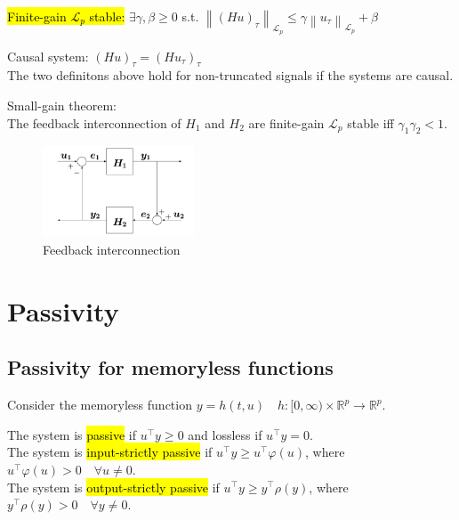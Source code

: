 \begin{definition}
    \hl{Finite-gain $\mathscr{L}_{p}$ stable:}
    $\exists\gamma, \beta \geq 0$ s.t. $\left\|(H u)_{\tau}\right\|_{\mathscr{L}_{p}} \leq \gamma\left\|u_{\tau}\right\|_{\mathscr{L}_{p}}+\beta$
\end{definition}
\begin{definition}
    Causal system: $(H u)_{\tau}=\left(H u_{\tau}\right)_{\tau}$\\
    The two definitons above hold for non-truncated signals if the systems are causal.
\end{definition}

\begin{theorem}
    Small-gain theorem:\\
    The feedback interconnection of $H_1$ and $H_2$ are finite-gain $\mathscr{L}_{p}$ stable
    iff $\gamma_1 \gamma_2 < 1$.
\end{theorem}
\begin{figure}[!htb]
        \includegraphics[width = 0.4\textwidth]{figures/fb.png}
        \caption{Feedback interconnection}
\end{figure}

\section{Passivity}
\subsection{Passivity for memoryless functions}
Consider the memoryless function $y=h(t, u) \quad h:[0, \infty) \times \mathbb{R}^{p} \rightarrow \mathbb{R}^{p}$.
\begin{definition}
    The system is \hl{passive} if $u^{\top} y \geq 0$ and lossless if $u^{\top} y=0$.\\
    The system is \hl{input-strictly passive} if $u^{\top} y \geq u^{\top} \varphi(u)$, where $u^{\top} \varphi(u)>0 \quad \forall u \neq 0$.\\
    The system is \hl{output-strictly passive} if $u^{\top} y \geq y^{\top} \rho(y)$, where $y^{\top} \rho(y)>0 \quad \forall y \neq 0$.
\end{definition}

